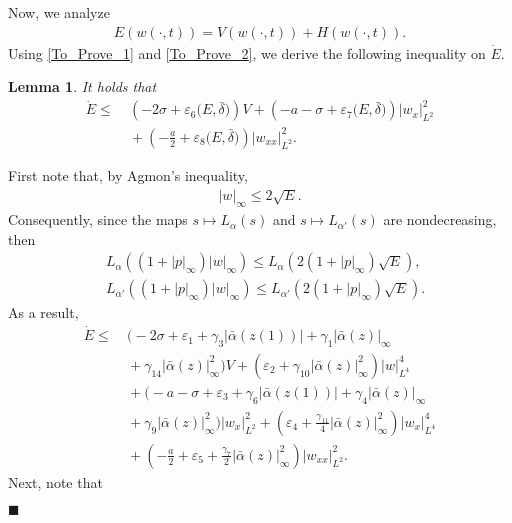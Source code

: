 \documentclass[twocolumn]{autart}
\newtheorem{lemm}{Lemma}
\newenvironment{lemma}{\begin{lemm}}{\hfill \end{lemm}}
\newenvironment{proof}{{\it Proof. }}{\hfill $\blacksquare$ }
\begin{document}
Now, we analyze 
\begin{align*}
E(w(\cdot,t)) = V(w(\cdot,t))+H(w(\cdot,t)). 
\end{align*}
Using \eqref{To_Prove_1} and \eqref{To_Prove_2}, we derive the following inequality on $\dot{E}$. 
\begin{lemma}
It holds that 
\begin{align}
\dot{E} \leq&~ \left(-2\sigma + \varepsilon_6\big(E,\bar{\delta}\big) \right)V +\left(-a-\sigma +\varepsilon_7\big(E,\bar{\delta}\big)  \right)|w_x|_{L^2}^2 \nonumber \\
&~+ \left( -\frac{a}{2}+\varepsilon_8\big(E,\bar{\delta}\big)\right)|w_{xx}|_{L^2}^2. \label{E_dot_2}
\end{align}
\hfill  
\end{lemma}
\begin{proof}
First note that, by Agmon's inequality,
\begin{align}
|w|_{\infty} \leq 2\sqrt{E}. \label{agmon_max}
\end{align}
Consequently, since the maps $s\mapsto L_{\alpha}(s)$ and $s\mapsto L_{\alpha'}(s)$ are nondecreasing, then 
\begin{align*}
&L_{\alpha}\left(\left(1+|p|_{\infty}\right)|w|_{\infty}\right) \leq L_{\alpha}\left(2\left(1+|p|_{\infty}\right)\sqrt{E}\right), \\
&L_{\alpha'}\left(\left(1+|p|_{\infty}\right)|w|_{\infty}\right) \leq L_{\alpha'}\left(2\left(1+|p|_{\infty}\right)\sqrt{E}\right).
\end{align*}
As a result,
\begin{align}
\dot{E} \leq&~ \bigg(-2\sigma + \varepsilon_1 + \gamma_3|\bar{\alpha}(z(1))|+\gamma_1|\bar{\alpha}(z)|_{\infty} \nonumber \\
&~+\gamma_{14}|\bar{\alpha}(z)|_{\infty}^2\bigg)V +\left(\varepsilon_2+\gamma_{10}|\bar{\alpha}(z)|_{\infty}^2\right)|w|_{L^4}^4\nonumber \\
&~+\big(-a-\sigma + \varepsilon_3 +\gamma_6 |\bar{\alpha}(z(1))|+\gamma_4|\bar{\alpha}(z)|_{\infty} \nonumber \\
&~+\gamma_9|\bar{\alpha}(z)|_{\infty}^2\big)|w_x|_{L^2}^2+\left(\varepsilon_4+\frac{\gamma_{11}}{4}|\bar{\alpha}(z)|_{\infty}^2\right)|w_x|_{L^4}^4 \nonumber \\
&~+ \left(-\frac{a}{2}+\varepsilon_5+\frac{\gamma_7}{2}|\bar{\alpha}(z)|_{\infty}^2\right)|w_{xx}|_{L^2}^2.  \label{E_dot_1}
\end{align}
Next, note that
\begin{align}

\end{align}
\end{proof}
\end{document}
